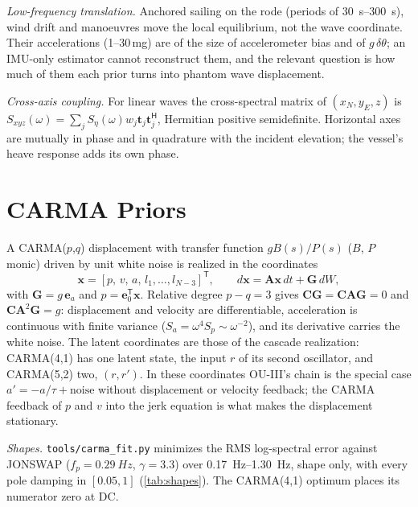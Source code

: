 \documentclass[conference]{IEEEtran}
\DeclareRobustCommand{\vct}[1]{\bm{#1}}
\DeclareRobustCommand{\mat}[1]{\bm{#1}}
\theoremstyle{bodysmall}
\begin{document}
\emph{Low-frequency translation.} Anchored sailing on the rode (periods of
\SIrange{30}{300}{s}), wind drift and manoeuvres move the local equilibrium,
not the wave coordinate. Their accelerations (1--30\,mg) are of the size of
accelerometer bias and of $g\,\delta\theta$; an IMU-only estimator cannot
reconstruct them, and the relevant question is how much of them each prior
turns into phantom wave displacement.

\emph{Cross-axis coupling.} For linear waves the cross-spectral matrix of
$(x_N,y_E,z)$ is $S_{xyz}(\omega)=\sum_jS_\eta(\omega)w_j\vct{t}_j
\vct{t}_j^{\mathsf H}$, Hermitian positive semidefinite. Horizontal axes are
mutually in phase and in quadrature with the incident elevation; the vessel's
heave response adds its own phase.

\section{CARMA Priors}
\label{sec:carma}
A CARMA($p$,$q$) displacement with transfer function $gB(s)/P(s)$ ($B$, $P$
monic) driven by unit white noise is realized in the coordinates
\begin{equation}
\vct{x}=[p,\,v,\,a,\,l_1,\dots,l_{N-3}]^{\mathsf T},\qquad
d\vct{x}=\mat{A}\vct{x}\,dt+\vct{G}\,dW,
\label{eq:carma-ss}
\end{equation}
with $\vct{G}=g\,\vct{e}_a$ and $p=\vct{e}_0^{\mathsf T}\vct{x}$. Relative
degree $p-q=3$ gives $\mat{C}\vct{G}=\mat{C}\mat{A}\vct{G}=0$ and
$\mat{C}\mat{A}^2\vct{G}=g$: displacement and velocity are differentiable,
acceleration is continuous with finite variance
($S_a=\omega^4S_p\sim\omega^{-2}$), and its derivative carries the white
noise. The latent coordinates are those of the cascade realization:
CARMA(4,1) has one latent state, the input $r$ of its second oscillator, and
CARMA(5,2) two, $(r,r')$. In these coordinates OU-III's chain is the special
case $a'=-a/\tau+\text{noise}$ without displacement or velocity feedback;
the CARMA feedback of $p$ and $v$ into the jerk equation is what makes the
displacement stationary.

\emph{Shapes.} \texttt{tools/carma\_fit.py} minimizes the RMS log-spectral
error against JONSWAP ($f_p=\SI{0.29}{Hz}$, $\gamma=3.3$) over
\SIrange{0.17}{1.30}{Hz}, shape only, with every pole damping in $[0.05,1]$
(\cref{tab:shapes}). The CARMA(4,1) optimum places its numerator zero at DC.
\end{document}
